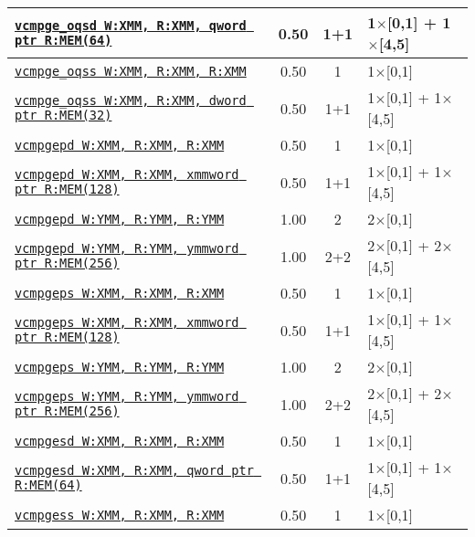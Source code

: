 \documentclass[a4paper,english,fontsize=9]{scrartcl}
\begin{document}
\begin{longtable}{p{}ccL{.25\textwidth}}
  \midrule
  \texttt{\href{https://felixcloutier.com/x86/CMPSD.html}{vcmpge\_oqsd W:XMM, R:XMM, qword ptr R:MEM(64)}} & 0.50 & 1+1 & 1\(\times\)[0,1] + 1\(\times\)[4,5] \\
  \midrule
  \texttt{\href{https://felixcloutier.com/x86/CMPSS.html}{vcmpge\_oqss W:XMM, R:XMM, R:XMM}} & 0.50 & 1 & 1\(\times\)[0,1] \\
  \midrule
  \texttt{\href{https://felixcloutier.com/x86/CMPSS.html}{vcmpge\_oqss W:XMM, R:XMM, dword ptr R:MEM(32)}} & 0.50 & 1+1 & 1\(\times\)[0,1] + 1\(\times\)[4,5] \\
  \midrule
  \texttt{\href{https://felixcloutier.com/x86/CMPPD.html}{vcmpgepd W:XMM, R:XMM, R:XMM}} & 0.50 & 1 & 1\(\times\)[0,1] \\
  \midrule
  \texttt{\href{https://felixcloutier.com/x86/CMPPD.html}{vcmpgepd W:XMM, R:XMM, xmmword ptr R:MEM(128)}} & 0.50 & 1+1 & 1\(\times\)[0,1] + 1\(\times\)[4,5] \\
  \midrule
  \texttt{\href{https://felixcloutier.com/x86/CMPPD.html}{vcmpgepd W:YMM, R:YMM, R:YMM}} & 1.00 & 2 & 2\(\times\)[0,1] \\
  \midrule
  \texttt{\href{https://felixcloutier.com/x86/CMPPD.html}{vcmpgepd W:YMM, R:YMM, ymmword ptr R:MEM(256)}} & 1.00 & 2+2 & 2\(\times\)[0,1] + 2\(\times\)[4,5] \\
  \midrule
  \texttt{\href{https://felixcloutier.com/x86/CMPPS.html}{vcmpgeps W:XMM, R:XMM, R:XMM}} & 0.50 & 1 & 1\(\times\)[0,1] \\
  \midrule
  \texttt{\href{https://felixcloutier.com/x86/CMPPS.html}{vcmpgeps W:XMM, R:XMM, xmmword ptr R:MEM(128)}} & 0.50 & 1+1 & 1\(\times\)[0,1] + 1\(\times\)[4,5] \\
  \midrule
  \texttt{\href{https://felixcloutier.com/x86/CMPPS.html}{vcmpgeps W:YMM, R:YMM, R:YMM}} & 1.00 & 2 & 2\(\times\)[0,1] \\
  \midrule
  \texttt{\href{https://felixcloutier.com/x86/CMPPS.html}{vcmpgeps W:YMM, R:YMM, ymmword ptr R:MEM(256)}} & 1.00 & 2+2 & 2\(\times\)[0,1] + 2\(\times\)[4,5] \\
  \midrule
  \texttt{\href{https://felixcloutier.com/x86/CMPSD.html}{vcmpgesd W:XMM, R:XMM, R:XMM}} & 0.50 & 1 & 1\(\times\)[0,1] \\
  \midrule
  \texttt{\href{https://felixcloutier.com/x86/CMPSD.html}{vcmpgesd W:XMM, R:XMM, qword ptr R:MEM(64)}} & 0.50 & 1+1 & 1\(\times\)[0,1] + 1\(\times\)[4,5] \\
  \midrule
  \texttt{\href{https://felixcloutier.com/x86/CMPSS.html}{vcmpgess W:XMM, R:XMM, R:XMM}} & 0.50 & 1 & 1\(\times\)[0,1] \\

\end{longtable}
\end{document}
